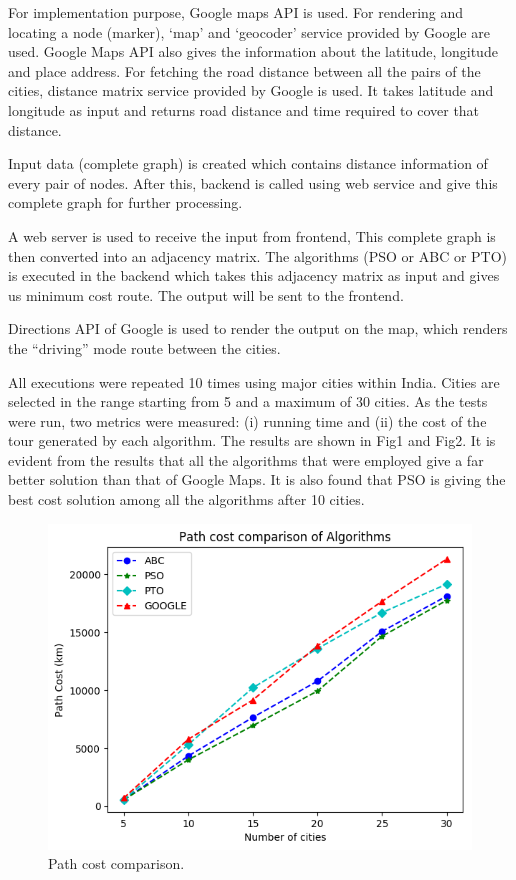 \documentclass[conference]{IEEEtran}
\begin{document}
For implementation purpose, Google maps API is used. For rendering and locating a node (marker), ‘map’ and ‘geocoder’ service provided by Google are used. Google Maps API also gives the information about the latitude, longitude and place address. For fetching the road distance between all the pairs of the cities, distance matrix service provided by Google is used. It takes latitude and longitude as input and returns road distance and time required to cover that distance.

Input data (complete graph) is created which contains distance information of every pair of nodes. After this, backend is called using web service and give this complete graph for further processing.

A web server is used to receive the input from frontend, This complete graph is then converted into an adjacency matrix. The algorithms (PSO or ABC or PTO) is executed in the backend which takes this adjacency matrix as input and gives us minimum cost route. The output will be sent to the frontend.

Directions API of Google is used to render the output on the map, which renders the “driving” mode route between the cities.

All executions were repeated 10 times using major cities within India. Cities are selected in the range starting from 5 and a maximum of 30 cities. As the tests were run, two metrics were measured: (i) running time and (ii) the cost of the tour generated by each algorithm. The results are shown in Fig1 and Fig2. It is evident from the results that all the algorithms that were employed give a far better solution than that of Google Maps. It is also found that PSO is giving the best cost solution among all the algorithms after 10 cities.

\begin{figure}[htbp]
\centerline{\includegraphics[width=\columnwidth]{pathcost.png}}
\caption{Path cost comparison.}
\label{fig1}
\end{figure}
\end{document}
